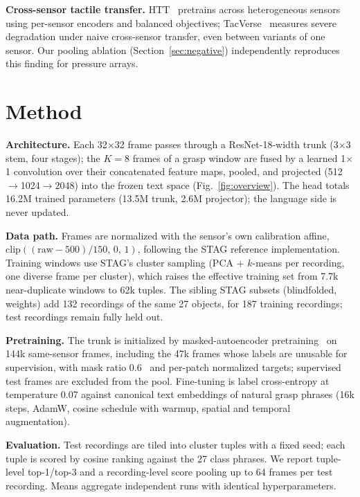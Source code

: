 \documentclass[conference]{IEEEtran}
\begin{document}
\textbf{Cross-sensor tactile transfer.} HTT~\cite{bi2026htt} pretrains across
heterogeneous sensors using per-sensor encoders and balanced objectives;
TacVerse~\cite{wei2026tacverse} measures severe degradation under naive cross-sensor
transfer, even between variants of one sensor. Our pooling ablation
(Section~\ref{sec:negative}) independently reproduces this finding for pressure arrays.

\section{Method}
\textbf{Architecture.} Each 32$\times$32 frame passes through a ResNet-18-width trunk
(3$\times$3 stem, four stages); the $K{=}8$ frames of a grasp window are fused by a learned
1$\times$1 convolution over their concatenated feature maps, pooled, and projected
(512$\rightarrow$1024$\rightarrow$2048) into the frozen text space
(Fig.~\ref{fig:overview}). The head totals 16.2M trained parameters (13.5M trunk, 2.6M projector); the language side is
never updated.

\textbf{Data path.} Frames are normalized with the sensor's own calibration affine,
$\mathrm{clip}((\mathrm{raw}-500)/150,\,0,\,1)$, following the STAG reference
implementation. Training windows use STAG's cluster sampling (PCA + $k$-means per
recording, one diverse frame per cluster), which raises the effective training set from
7.7k near-duplicate windows to 62k tuples. The sibling STAG subsets (blindfolded, weights)
add 132 recordings of the same 27 objects, for 187 training recordings; test recordings
remain fully held out.

\textbf{Pretraining.} The trunk is initialized by masked-autoencoder
pretraining~\cite{he2022mae} on 144k same-sensor frames, including the 47k frames whose
labels are unusable for supervision, with mask ratio 0.6~\cite{bi2026htt} and per-patch
normalized targets; supervised test frames are excluded from the pool. Fine-tuning is label
cross-entropy at temperature 0.07 against canonical text embeddings of natural grasp
phrases (16k steps, AdamW, cosine schedule with warmup, spatial and temporal augmentation).

\textbf{Evaluation.} Test recordings are tiled into cluster tuples with a fixed seed; each
tuple is scored by cosine ranking against the 27 class phrases. We report tuple-level
top-1/top-3 and a recording-level score pooling up to 64 frames per test recording. Means
aggregate independent runs with identical hyperparameters.
\end{document}
